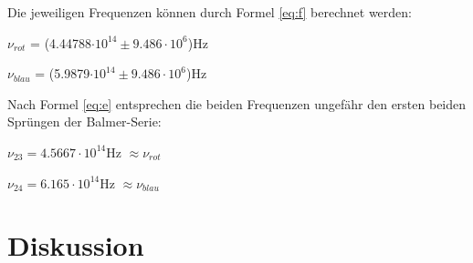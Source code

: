 \documentclass[12pt,a4paper]{article}
\begin{document}
\vspace{5pt}
Die jeweiligen Frequenzen k\"onnen durch Formel \ref{eq:f} berechnet werden:\vspace{5pt}

$\nu_{rot}$ = (4.44788$\cdot 10^{14} \pm 9.486 \cdot 10^6$)Hz

$\nu_{blau}$ = (5.9879$\cdot 10^{14} \pm 9.486 \cdot 10^6$)Hz

\vspace{5pt}
Nach Formel \ref{eq:e} entsprechen die beiden Frequenzen ungef\"ahr den ersten beiden Spr\"ungen der Balmer-Serie:\vspace{5pt}

$\nu_{23} = 4.5667\cdot 10^{14}$Hz $\approx\nu_{rot}$

$\nu_{24} = 6.165\cdot 10^{14}$Hz $\approx\nu_{blau}$


\section*{Diskussion}
\end{document}
